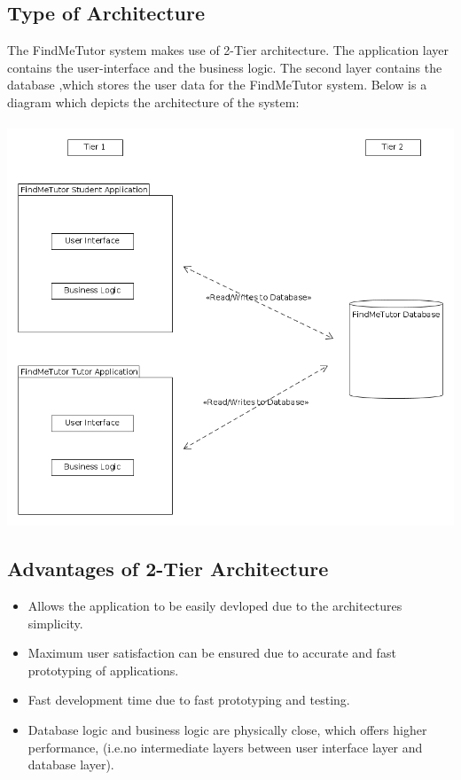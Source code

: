 \documentclass[12pt]{article}
\begin{document}
\subsection{Type of Architecture}
The FindMeTutor system makes use of 2-Tier architecture. The application layer contains the user-interface and the business logic. The second layer contains the database ,which stores the user data for the FindMeTutor system. Below is a diagram which depicts the architecture of the system:\\\\
\includegraphics[width=140mm]{./2_Tier_Diagram.png}\\

\subsection{Advantages of 2-Tier Architecture}
\begin{itemize}
\item Allows the application to be easily devloped due to the architectures simplicity.
\item Maximum user satisfaction can be ensured due to accurate and fast prototyping of applications.
\item Fast development time due to fast prototyping and testing.
\item Database logic and business logic are physically close, which offers higher performance, (i.e.no intermediate layers between user interface layer and database layer).\\
\end{itemize}
\end{document}
